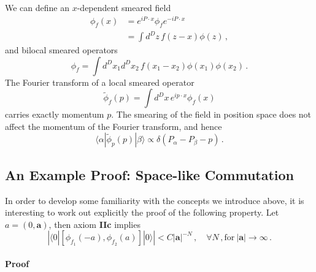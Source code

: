 We can define an $x$-dependent smeared field
\begin{align}
    \label{eq:XdepPhiSmeared}
    \phi_f(x) 
    &= e^{i P \cdot x} \phi_f e^{-i P \cdot x} \\
    &= \int d^Dz\, f(z-x) \phi(z)\, ,
\end{align}
and bilocal smeared operators
\begin{equation}
    \label{eq:BilocalSmeared}
    \phi_f = \int d^Dx_1 d^Dx_2\, f\left(x_1 - x_2\right) 
    \phi(x_1) \phi(x_2)\, .
\end{equation}
The Fourier transform of a local smeared operator
\begin{equation}
    \label{eq:FourierSmeared}
    \tilde\phi_f(p) = \int d^Dx\, e^{i p\cdot x} \phi_f(x)
\end{equation}
carries exactly momentum $p$. The smearing of the field in position space does
not affect the momentum of the Fourier transform, and hence
\begin{equation}
    \label{eq:DeltaMomSmeared}
    \langle \alpha | \tilde\phi_p(p) | \beta\rangle 
    \propto \delta\left(P_\alpha-P_\beta-p\right)\, .
\end{equation}

\subsection{An Example Proof: Space-like Commutation}
\label{sec:ExampleProof}

In order to develop some familiarity with the concepts we introduce above, it is
interesting to work out explicitly the proof of the following property. Let
$a=\left(0, \mathbf{a}\right)$, then axiom {\bf IIc} implies
\begin{equation}
    \label{eq:FasterThanPoly}
    \left| \langle 0 |
        \left[ \phi_{f_1}(-a), \phi_{f_2}(a)\right]
        | 0 \rangle 
    \right| < C \left|\mathbf{a}\right|^{-N}\, , \quad \forall N\, , 
    \mathrm{for}~\left|\mathbf{a}\right|\to\infty\, .
\end{equation}

\paragraph{Proof}

